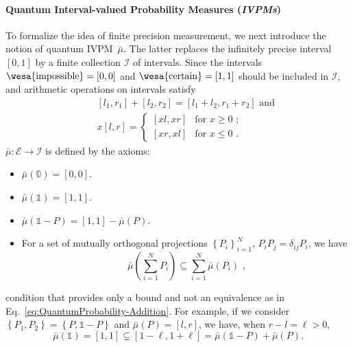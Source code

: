 \documentclass[english,reprint, aps, prl,superscriptaddress, showpacs,
showkeys, longbibliography, amsmath, amssymb]{revtex4-1}
\theoremstyle{plain}
\theoremstyle{definition}
\newcommand{\events}{\ensuremath{\mathcal{E}}}
\newcommand{\imposs}{{\text{\wesa{impossible}}}}
\newcommand{\necess}{{\text{\wesa{certain}}}}
\begin{document}
\paragraph{Quantum Interval-valued Probability Measures (\emph{IVPMs})}

To formalize the idea of finite precision measurement, we next introduce
the notion of quantum IVPM~$\bar{\mu}$. The latter replaces the
infinitely precise interval $[0,1]$ by a finite collection $\mathscr{I}$
of intervals. Since the intervals $\imposs=\left[0,0\right]$ and
$\necess=\left[1,1\right]$ should be included in $\mathscr{I}$,
and arithmetic operations on intervals satisfy \begin{subequations}\label{eq:interval-operations}
\begin{eqnarray}
 &  & [l_{1},r_{1}]+[l_{2},r_{2}]=[l_{1}+l_{2},r_{1}+r_{2}]\textrm{ and}\\
 &  & x[l,r]=\begin{cases}
[xl,xr] & \textrm{for }x\ge0\textrm{ ;}\\{}
[xr,xl] & \textrm{for }x\le0\textrm{ .}
\end{cases}
\end{eqnarray}
\end{subequations} $\bar{\mu}:\events\rightarrow\mathscr{I}$ is
defined by the axioms: 
\begin{itemize}
\item $\bar{\mu}(\mathbb{0})=\left[0,0\right]$. 
\item $\bar{\mu}(\mathbb{1})=\left[1,1\right]$. 
\item $\bar{\mu}\left(\mathbb{1}-P\right)=\left[1,1\right]-\bar{\mu}\left(P\right)$. 
\item For a set of mutually orthogonal projections $\left\{ P_{i}\right\} _{i=1}^{N}$,
$P_{i}P_{j}=\delta_{ij}P_{i}$, we have 
\begin{equation}
\bar{\mu}\left(\sum_{i=1}^{N}P_{i}\right)\subseteq\sum_{i=1}^{N}\bar{\mu}\left(P_{i}\right)\textrm{ ,}\label{eq:QuantumInterval-valuedProbability-Inclusion}
\end{equation}
\end{itemize}
condition that provides only a bound and not an equivalence as in
Eq.~\eqref{eq:QuantumProbability-Addition}. For example, if we consider
$\left\{ P_{1},P_{2}\right\} =\left\{ P,\mathbb{1}-P\right\} $ and
$\bar{\mu}\left(P\right)=\left[l,r\right]$, we have, when $r-l=\ell>0$,
\[
\bar{\mu}(\mathbb{1})=\left[1,1\right]\subsetneq\left[1-\ell,1+\ell\right]=\bar{\mu}\left(\mathbb{1}-P\right)+\bar{\mu}\left(P\right).
\]
\end{document}
